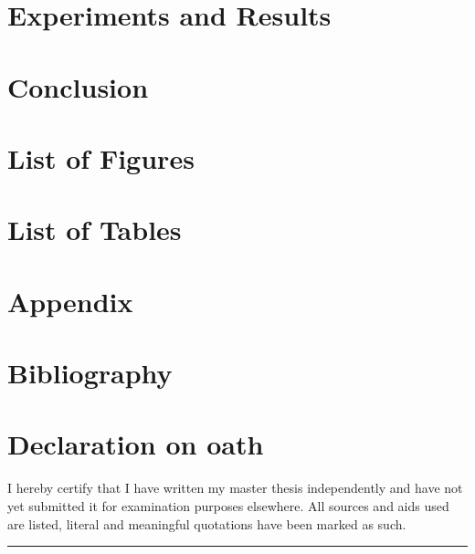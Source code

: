 \documentclass[a4paper,12pt]{article}
\begin{document}
\newpage 

\section*{Experiments and Results}

\newpage 

\section*{Conclusion}

\newpage 

\newpage 

\section*{List of Figures}

\newpage 

\newpage 

\section*{List of Tables}

\newpage 

\newpage 

\section*{Appendix}

\newpage 

\newpage 

\section*{Bibliography}

\newpage 

\newpage 

\section*{Declaration on oath}

\vspace{1cm}

\noindent I hereby certify that I have written my master thesis independently and have not yet submitted it for examination purposes elsewhere. All sources and aids used are listed, literal and meaningful quotations have been marked as such.

\vspace{3cm}
\hfill\rule{15cm}{0.4pt} %
\end{document}
